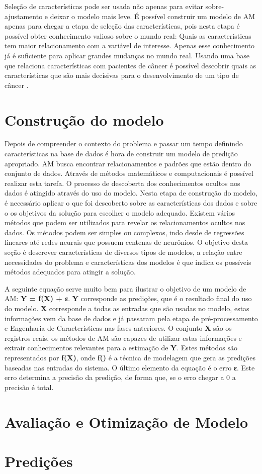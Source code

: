 Seleção de características pode ser usada não apenas para evitar sobre-ajustamento e deixar o modelo mais leve. É possível construir um modelo de AM apenas para chegar a etapa de seleção das características, pois nesta etapa é possível obter conhecimento valioso sobre o mundo real: Quais as características tem maior relacionamento com a variável de interesse. Apenas esse conhecimento já é suficiente para aplicar grandes mudanças no mundo real. Usando uma base que relaciona características com pacientes de câncer é possível descobrir quais as características que são mais decisivas para o desenvolvimento de um tipo de câncer \cite{real2013}.

\section{Construção do modelo}
Depois de compreender o contexto do problema e passar um tempo definindo características na base de dados é hora de construir um modelo de predição apropriado. AM busca encontrar relacionamentos e padrões que estão dentro do conjunto de dados. Através de métodos matemáticos e computacionais é possível realizar esta tarefa. O processo de descoberta dos conhecimentos ocultos nos dados é atingido através do uso do modelo. Nesta etapa de construção do modelo, é necessário aplicar o que foi descoberto sobre as características dos dados e sobre o os objetivos da solução para escolher o modelo adequado. Existem vários métodos que podem ser utilizados para revelar os relacionamentos ocultos nos dados. Os métodos podem ser simples ou complexos, indo desde de regressões lineares até redes neurais que possuem centenas de neurônios. O objetivo desta seção é descrever características de diversos tipos de modelos, a relação entre necessidades do problema e características dos modelos é que indica os possíveis métodos adequados para atingir a solução. 

A seguinte equação serve muito bem para ilustrar o objetivo de um modelo de AM:\textbf{ Y = f(X) + ε}. \textbf{Y} corresponde as predições, que é o resultado final do uso do modelo. \textbf{X} corresponde a todas as entradas que são usadas no modelo, estas informações vem da base de dados e já passaram pela etapa de pré-processamento e Engenharia de Características nas fases anteriores. O conjunto \textbf{X} são os registros reais, os métodos de AM são capazes de utilizar estas informações e extrair conhecimentos relevantes para a estimação de \textbf{Y}. Estes  métodos são representados por \textbf{f(X)}, onde \textbf{f()} é a técnica de modelagem que gera as predições baseadas nas entradas do sistema. O último elemento da equação é o erro \textbf{ε}. Este erro determina a precisão da predição, de forma que, se o erro chegar a 0 a precisão é total.


\section{Avaliação e Otimização de Modelo}
\section{Predições}


